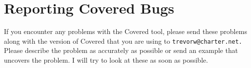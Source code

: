 \section{Reporting Covered Bugs}\label{page_bugs}


If you encounter any problems with the Covered tool, please send these problems along with the version of Covered that you are using to {\tt trevorw@charter.net.} Please describe the problem as accurately as possible or send an example that uncovers the problem. I will try to look at these as soon as possible.

